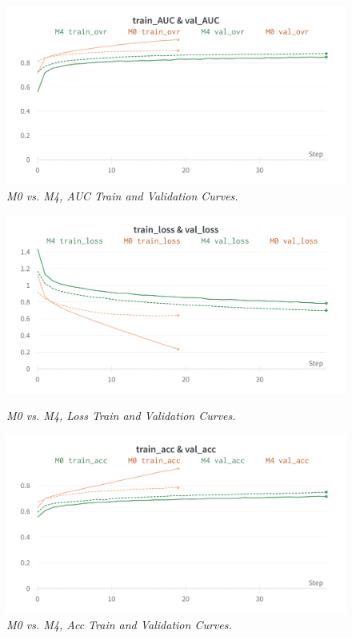 \begin{figure}[H]
  \centering
  \includegraphics[width=\textwidth]{imatges/results/AUCM0M4.png}
  \caption[M0 vs. M4, AUC Train and Validation Curves]{\textit{M0 vs. M4, AUC Train and Validation Curves. }}
\end{figure}

\newpage

\begin{figure}[H]
  \centering
  \includegraphics[width=\textwidth]{imatges/results/LossM0M4.png}
  \caption[M0 vs. M4, Loss Train and Validation Curves]{\textit{M0 vs. M4, Loss Train and Validation Curves. }}
  {\label{fig:lossm0m4}}
\end{figure}

\begin{figure}[H]
  \centering
  \includegraphics[width=\textwidth]{imatges/results/AccM0M4.png}
  \caption[M0 vs. M4, Acc Train and Validation Curves]{\textit{M0 vs. M4, Acc Train and Validation Curves. }}
\end{figure}

